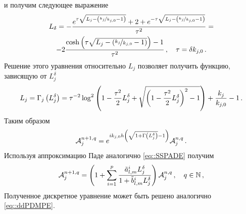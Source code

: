 \documentclass[../document.tex]{subfiles}
\begin{document}
                и получим следующее выражение
                \begin{multline}
                    L_\delta=-\frac{e^{\tau\sqrt{L_j-\left(\nicefrac{k_j}{k_{j,0}}-1\right)}}+2+e^{-\tau\sqrt{L_j-\left(\nicefrac{k_j}{k_{j,0}}-1\right)}}}{\tau^2}=\\
                    -2\frac{\cosh\left(\tau\sqrt{L_j-\left(\nicefrac{k_j}{k_{j,0}}-1\right)}\right)-1}{\tau^2}\,,\quad\tau=\delta k_{j,0}\,.
                \end{multline}
                Решение этого уравнения относительно $L_j$ позволяет получить функцию, зависящую от $L_j^\delta$
                \begin{equation}
                    L_j=\Gamma_j\left(L_j^\delta\right)=\tau^{-2}\log^2\left(1-\frac{\tau^2}{2}L_j^\delta+\sqrt{\left(1-\frac{\tau^2}{2}L_j^\delta\right)^2-1}\right)+\frac{k_j}{k_{j,0}}-1\,.
                \end{equation}
                Таким образом 
                \begin{equation}
                    \mathcal{A}_j^{n+1,q}=e^{ik_{j,0}h\left(\sqrt{1+\Gamma\left(L_j^\delta\right)}-1\right)}\mathcal{A}_j^{n,q}\,.
                \end{equation}
                Используя аппроксимацию Паде аналогично \eqref{eq::SSPADE} получим
                \begin{equation}
                    \mathcal{A}_j^{n+1,q}=\left(1+\sum\limits_{i=1}^p\frac{\tilde{a}_{l,m}^iL_j^\delta}{1+\tilde{b}_{l,m}^iL_j^\delta}\right)\mathcal{A}_j^{n,q}\,,\quad q\in\mathbb{N}\,,
                \end{equation}
                Полученное дискретное уравнение может быть решено аналогично \eqref{eq::ddPDMPE}.
\end{document}
